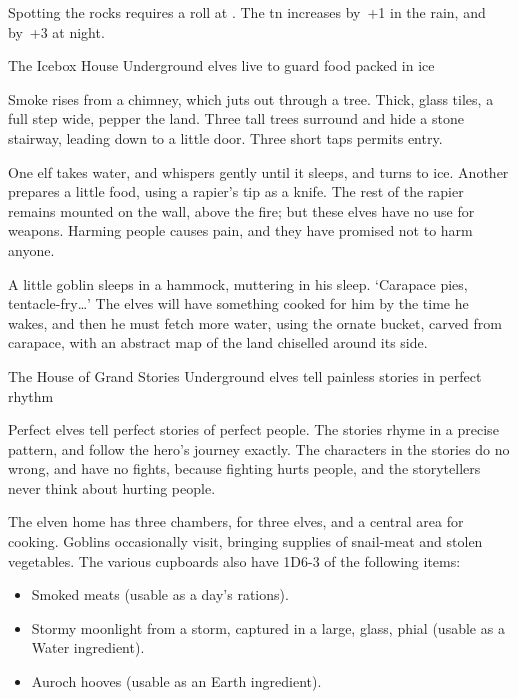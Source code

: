 \begin{multicols}{2}
Spotting the rocks requires a  roll at \tn[12].
The \gls{tn} increases by~+1 in the rain, and by~+3 at night.


{The Icebox House}%
{Underground elves live to guard food packed in ice}%


Smoke rises from a chimney, which juts out through a tree.
Thick, glass tiles, a full step wide, pepper the land.
Three tall trees surround and hide a stone stairway, leading down to a little door.
Three short taps permits entry.

One elf takes water, and whispers gently until it sleeps, and turns to ice.
Another prepares a little food, using a rapier's tip as a knife.
The rest of the rapier remains mounted on the wall, above the fire; but these elves have no use for weapons.
Harming people causes pain, and they have promised not to harm anyone.

A little goblin sleeps in a hammock, muttering in his sleep.
`Carapace pies, tentacle-fry\ldots'
The elves will have something cooked for him by the time he wakes, and then he must fetch more water, using the ornate bucket, carved from carapace, with an abstract map of the land chiselled around its side.

{The House of Grand Stories}%
{Underground elves tell painless stories in perfect rhythm}%

Perfect elves tell perfect stories of perfect people.
The stories rhyme in a precise pattern, and follow the hero's journey exactly.
The characters in the stories do no wrong, and have no fights, because fighting hurts people, and the storytellers never think about hurting people.

The elven home has three chambers, for three elves, and a central area for cooking.
Goblins occasionally visit, bringing supplies of snail-meat and stolen vegetables.
The various cupboards also have 1D6-3 of the following items:

\begin{itemize}
  \item
  Smoked meats (usable as a day's rations).
  \item
  Stormy moonlight from a storm, captured in a large, glass, phial (usable as a Water \gls{ingredient}).
  \item
  Auroch hooves (usable as an Earth \gls{ingredient}).
\end{itemize}

\end{multicols}

